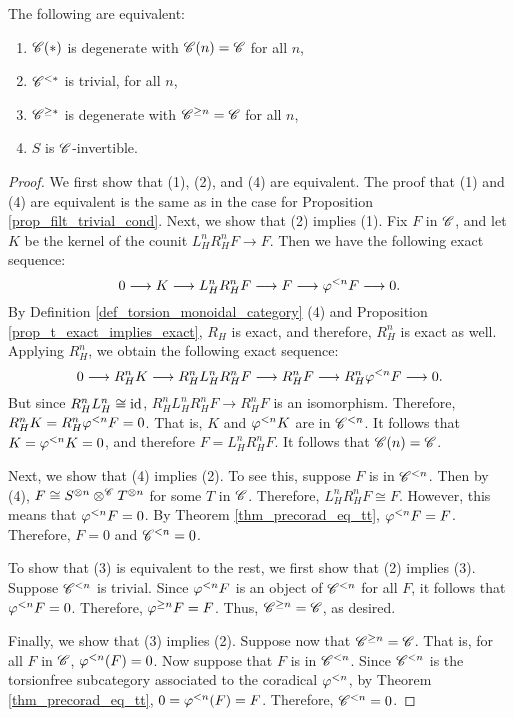 \begin{prop}\label{prop_torsion_filt_degen_cond}
The following are equivalent:
\begin{enumerate}
\item $\SGFilt{*}{\Cat{C}}$ is degenerate with $\SGFilt{n}{\Cat{C}} = 
\Cat{C}$ for all $n$,

\item $\Corad{*}{\Cat{C}}$ is trivial,
for all $n$,

\item $\Prerad{*}{\Cat{C}}$ is degenerate with $\Prerad{n}{\Cat{C}} = 
\Cat{C}$ for all $n$,

\item $S$ is $\Cat{C}$-invertible.
\end{enumerate}
\end{prop}
\begin{proof}
We first show that (1), (2), and (4) are equivalent. The proof that
(1) and (4) are equivalent is the same as in the case for Proposition
\ref{prop_filt_trivial_cond}. Next, we show that (2) implies (1).
 Fix $F$ in $\Cat{C}$, and let $K$ be the kernel of
the counit $L_H^n R_H^n F \to F$. Then we have the following exact
sequence:
\[
0 \to K \to L_H^n R_H^n F \to F \to \corad{n} F \to 0.
\]
By Definition \ref{def_torsion_monoidal_category} (4) and Proposition
\ref{prop_t_exact_implies_exact}, $R_H$ is exact, and therefore, $R_H^n$
is exact as well. Applying $R_H^n$, we obtain the following exact sequence:
\[
0 \to R_H^n K \to R_H^n L_H^n R_H^n F \to R_H^n F \to R_H^n \corad{n} F \to 0.
\]
But since $R_H^n L_H^n \cong \id$, $R_H^n L_H^n R_H^n F \to R_H^n F$ is 
an isomorphism. Therefore, $R_H^n K = R_H^n \corad{n} F = 0$. That is,
$K$ and $\corad{n} K$ are in $\Corad{n}{\Cat{C}}$. It follows that
$K = \corad{n} K = 0$, and therefore $F = L_H^n R_H^n F$. It follows that
$\SGFilt{n}{\Cat{C}} = \Cat{C}$.

Next, we show that (4) implies (2). To see this, suppose $F$ is in 
$\Corad{n}{\Cat{C}}$. Then by (4), $F \cong S^{\tensor n} 
\tensor^{\Cat{C}} T^{\tensor n}$ for some $T$ in $\Cat{C}$. Therefore,
$L_H^n R_H^n F \cong F$. However, this means that $\corad{n} F = 0$.
By Theorem \ref{thm_precorad_eq_tt}, $\corad{n} F = F$. Therefore,
$F = 0$ and $\Corad{n}{\Cat{C}} = 0$.

To show that (3) is equivalent to the rest, we first show that (2) 
implies (3). Suppose $\Corad{n}{\Cat{C}}$ is trivial. Since 
$\corad{n} F$ is an object of $\Corad{n}{\Cat{C}}$ for all $F$, it 
follows that $\corad{n}F = 0$. Therefore, $\prerad{n}F = F$. Thus, 
$\Prerad{n}{\Cat{C}} = \Cat{C}$, as desired.

Finally, we show that (3) implies (2). Suppose now that 
$\Prerad{n}{\Cat{C}} = \Cat{C}$. That is, for all $F$ in 
$\Cat{C}$, $\corad{n}(F) = 0$. Now suppose that $F$ is in 
$\Corad{n}{\Cat{C}}$. Since $\Corad{n}{\Cat{C}}$ is the 
torsionfree subcategory associated to the coradical $\corad{n}$, 
by Theorem \ref{thm_precorad_eq_tt}, $0 = \corad{n}(F) = F$. 
Therefore, $\Corad{n}{\Cat{C}} = 0$.
\end{proof}

